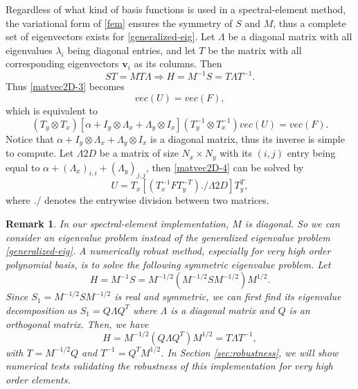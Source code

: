 \documentclass{article}
\newtheorem{remark}{Remark}
\begin{document}
Regardless of what kind of basis functions is used in a spectral-element method, the variational form of \eqref{fem} ensures the symmetry of $S$ and $M$, thus a complete set of eigenvectors exists for \eqref{generalized-eig}.
Let $\Lambda$ be a diagonal matrix with all eigenvalues $\lambda_i$ being diagonal entries, and let $T$ be the matrix with all corresponding eigenvectors $\mathbf v_i$ as its columns. Then 
\[ST=M T \Lambda\Rightarrow H=M^{-1}S=T\Lambda T^{-1}. \]
Thus \eqref{matvec2D-3} becomes
\begin{equation*} 
    [\alpha  + {(T_y I_y T_y^{-1})\otimes (T_x \Lambda_x T_x^{-1}) + (T_y\Lambda_y T_y^{-1})\otimes (T_x I_x T_x^{-1})}]vec(U) = vec(F),
\end{equation*}
which is equivalent to
\begin{equation}\label{matvec2D-4}
    (T_y\otimes T_x)[\alpha  + {I_y \otimes   \Lambda_x + \Lambda_y  \otimes  I_x}] (T_y^{-1}\otimes T_x^{-1})vec(U) = vec(F).
\end{equation}
Notice that $\alpha  +  I_y \otimes   \Lambda_x +\Lambda_y  \otimes  I_x$ is a diagonal matrix,   thus its inverse is simple to compute. 
Let $\Lambda2D$ be a matrix of size $N_x\times N_y$ with its $(i,j)$ entry being equal to $\alpha+(\Lambda_x)_{i,i}+(\Lambda_y)_{j,j}$, then  \eqref{matvec2D-4} can be solved by  
\begin{equation}
    U= T_x[(T_x^{-1}F T_y^{-T})./\Lambda2D]T_y^{T}, 
    \label{tensormethod-2D}
\end{equation}
where $./$ denotes the entrywise division between two matrices. 




\begin{remark}
\label{remark:robustness}
In our spectral-element implementation, $M$ is diagonal. So we can consider an eigenvalue problem instead of the generalized eigenvalue problem \eqref{generalized-eig}.
A numerically robust method, especially for very high order polynomial basis, is   to solve the following symmetric eigenvalue problem. Let
\begin{equation*}
    H = M^{-1}S = M^{-1/2} (M^{-1/2}SM^{-1/2}) M^{1/2}.
\end{equation*}
Since $S_1 = M^{-1/2}SM^{-1/2}$ is real and symmetric, we can first find its eigenvalue decomposition as $S_1 = Q\Lambda Q^T$ where $\Lambda$ is a diagonal matrix and $Q$ is an orthogonal matrix. Then, we have 
\begin{equation*}
    H = M^{-1/2} (Q\Lambda Q^T) M^{1/2} = T\Lambda T^{-1},
\end{equation*}
with $T = M^{-1/2}Q$ and $T^{-1} = Q^T M^{1/2}$. In Section \ref{sec:robustness}, we will show numerical tests validating the robustness of this implementation for very high order elements. 
\end{remark}
 
\end{document}

